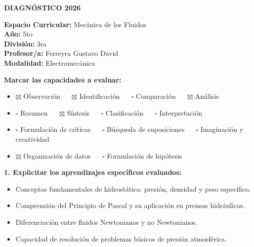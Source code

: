\documentclass[11pt, a4paper]{article}
\begin{document}
\noindent\colorbox{schoolgreen}{\begin{minipage}{\dimexpr\textwidth-2\fboxsep}\centering \textbf{\fontsize{14}{16}\selectfont DIAGNÓSTICO 2026}\end{minipage}}

\vspace{1.5em}

\begin{flushleft}
\textbf{Espacio Curricular:} Mecánica de los Fluidos \\
\textbf{Año:} 5to \\
\textbf{División:} 3ra \\
\textbf{Profesor/a:} Ferreyra Gustavo David \\
\textbf{Modalidad:} Electromecánica
\end{flushleft}

\vspace{1em}

\noindent \textbf{Marcar las capacidades a evaluar:}

\begin{itemize}
\item $\boxtimes$ Observación $\quad$ $\boxtimes$ Identificación $\quad$ $\square$ Comparación $\quad$ $\boxtimes$ Análisis
\item $\square$ Resumen $\quad$ $\boxtimes$ Síntesis $\quad$ $\square$ Clasificación $\quad$ $\square$ Interpretación
\item $\square$ Formulación de críticas $\quad$ $\square$ Búsqueda de suposiciones $\quad$ $\square$ Imaginación y creatividad
\item $\boxtimes$ Organización de datos $\quad$ $\square$ Formulación de hipótesis
\end{itemize}

\vspace{1em}

\noindent \textbf{1. Explicitar los aprendizajes específicos evaluados:}
\begin{itemize}
\item Conceptos fundamentales de hidrostática: presión, densidad y peso específico.
\item Comprensión del Principio de Pascal y su aplicación en prensas hidráulicas.
\item Diferenciación entre fluidos Newtonianos y no Newtonianos.
\item Capacidad de resolución de problemas básicos de presión atmosférica.
\end{itemize}
\end{document}
